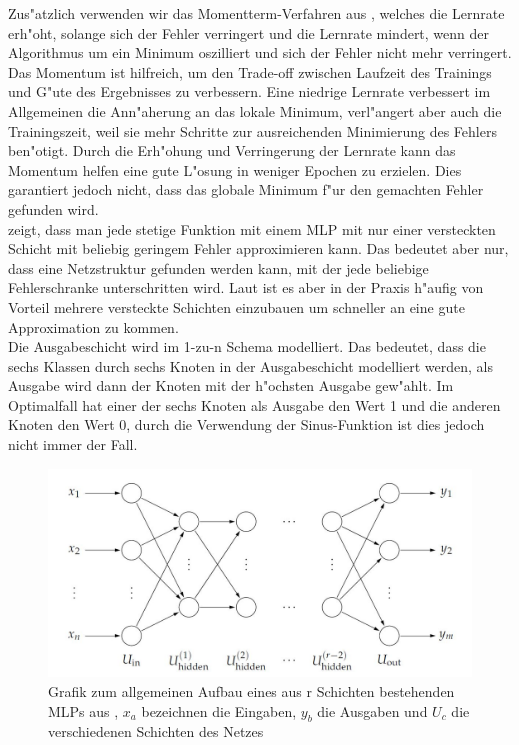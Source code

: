 Zus"atzlich verwenden wir das Momentterm-Verfahren aus \cite{rumelhart1988learning}, welches die Lernrate erh"oht, solange sich der Fehler verringert und die Lernrate mindert, wenn der Algorithmus um ein Minimum oszilliert und sich der Fehler nicht mehr verringert. Das Momentum ist hilfreich, um den Trade-off zwischen Laufzeit des Trainings und G"ute des Ergebnisses zu verbessern. Eine niedrige Lernrate verbessert im Allgemeinen die Ann"aherung an das lokale Minimum, verl"angert aber auch die Trainingszeit, weil sie mehr Schritte zur ausreichenden Minimierung des Fehlers ben"otigt. Durch die Erh"ohung und Verringerung der Lernrate kann das Momentum helfen eine gute L"osung in weniger Epochen zu erzielen. Dies garantiert jedoch nicht, dass das globale Minimum f"ur den gemachten Fehler gefunden wird. \\
\cite{pinkus1999approximation} zeigt, dass man jede stetige Funktion mit einem MLP mit nur einer versteckten Schicht mit beliebig geringem Fehler approximieren kann. Das bedeutet aber nur, dass eine Netzstruktur gefunden werden kann, mit der jede beliebige Fehlerschranke unterschritten wird. Laut \cite{kruse2011computational} ist es aber in der Praxis h"aufig von Vorteil mehrere versteckte Schichten einzubauen um schneller an eine gute Approximation zu kommen. \\
Die Ausgabeschicht wird im 1-zu-n Schema modelliert. Das bedeutet, dass die sechs Klassen durch sechs Knoten in der Ausgabeschicht modelliert werden, als Ausgabe wird dann der Knoten mit der h"ochsten Ausgabe gew"ahlt. Im Optimalfall hat einer der sechs Knoten als Ausgabe den Wert 1 und die anderen Knoten den Wert 0, durch die Verwendung der Sinus-Funktion ist dies jedoch nicht immer der Fall. 

\begin{figure}[h]
\includegraphics[width=\textwidth]{1_Grafiken/fig1kruse.jpg}
	\caption[Allgemeiner Aufbau eines mehrschichtigen Perzeptrons]{Grafik zum allgemeinen Aufbau eines aus r Schichten bestehenden MLPs aus \cite{kruse2011computational}, $x_a$ bezeichnen die Eingaben, $y_b$ die Ausgaben und $U_c$ die verschiedenen Schichten des Netzes}
\label{mlp}
\end{figure}

